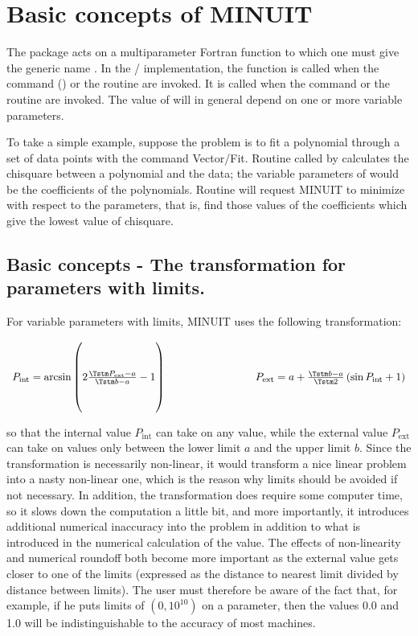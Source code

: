 \section{Basic concepts of MINUIT}

The \MINUIT{} package acts on a multiparameter Fortran function to which one
must give the generic name .
In the \PAW/\HBOOK{} implementation, the function  is called
 when the command  (\PAW)
or the routine  are invoked. 
It is called 
when the command  or the routine  are invoked.
The value of  will in general depend on one or more variable parameters.

To take a simple example, suppose the problem is to fit a polynomial through
a set of data points with the command Vector/Fit.
Routine  called by  calculates the chisquare between a
polynomial and the data; the variable parameters of  would be the
coefficients of the polynomials. 
Routine  will request MINUIT to minimize 
with respect to the parameters, that is, find those
values of the coefficients which give the lowest value of chisquare.

\subsection{Basic concepts - The transformation for parameters with limits.}

For variable parameters with limits, MINUIT uses the following transformation:

\[
\begin{array}{l@{\hspace{3cm}}l}
P_{\mathrm{int}} = \arcsin
        \left( 2 \frac{\Tstm P_{\mathrm{ext}}-a\Rule}{\Tstm b-a} - 1 \right)       &
P_{\mathrm{ext}} = a + \frac{\Tstm b - a}{\Tstm 2}
        \left( \sin P_{\mathrm{int}} + 1 \right)                  \\
\end{array}
\]

so that the internal value $P_{\mathrm{int}}$ can take on any value, while
the external value $P_{\mathrm{ext}}$ can take on values only between the lower
limit $a$ and the upper limit $b$.
Since the transformation is necessarily non-linear, it would transform a
nice linear problem into a nasty non-linear one, which is the reason why
limits should be avoided if not necessary. 
In addition, the transformation
does require some computer time, so it slows down the computation a little
bit, and more importantly, it introduces additional numerical inaccuracy into
the problem in addition to what is introduced in the numerical calculation
of the  value.  
The effects of non-linearity and numerical roundoff both
become more important as the external value gets closer to one of the limits
(expressed as the distance to nearest limit divided by distance between limits).
The user must therefore be aware of the fact that, for example,
if he puts limits of $(0,10^{10})$ on a parameter, then the values 0.0
and 1.0 will be indistinguishable to the accuracy of most machines.


